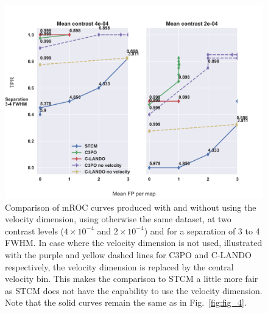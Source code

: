 \documentclass{aa}
\begin{document}
\begin{figure}
    \centering
    \includegraphics[width=\textwidth]{Fig6_final_September.png}
    \caption{Comparison of mROC curves produced with and without using the velocity dimension, using otherwise the same dataset, at two contrast levels ($4\times 10^{-4}$ and $2\times 10^{-4}$) and for a separation of 3 to 4 FWHM. In case where the velocity dimension is not used, illustrated with the purple and yellow dashed lines for C3PO and C-LANDO respectively, the velocity dimension is replaced by the central velocity bin. This makes the comparison to STCM a little more fair as STCM does not have the capability to use the velocity dimension.
    Note that the solid curves remain the same as in Fig.~\ref{fig:fig_4}.
    }
\end{figure}
\end{document}
